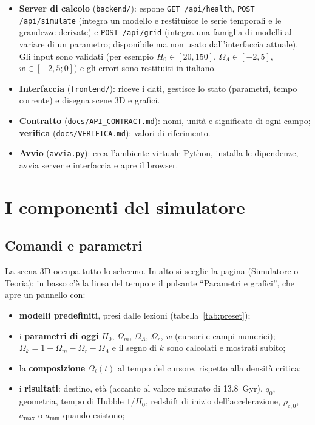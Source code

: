 \documentclass[11pt,a4paper]{article}
\newcommand{\Om}{\Omega_m}
\newcommand{\Or}{\Omega_r}
\newcommand{\OL}{\Omega_\Lambda}
\newcommand{\Ok}{\Omega_k}
\begin{document}
\begin{itemize}
  \item \textbf{Server di calcolo} (\texttt{backend/}): espone \texttt{GET /api/health}, \texttt{POST /api/simulate} (integra un modello e restituisce le serie temporali e le grandezze derivate) e \texttt{POST /api/grid} (integra una famiglia di modelli al variare di un parametro; disponibile ma non usato dall'interfaccia attuale). Gli input sono validati (per esempio $H_0\in[20,150]$, $\OL\in[-2,5]$, $w\in[-2{,}5;0]$) e gli errori sono restituiti in italiano.
  \item \textbf{Interfaccia} (\texttt{frontend/}): riceve i dati, gestisce lo stato (parametri, tempo corrente) e disegna scene 3D e grafici.
  \item \textbf{Contratto} (\texttt{docs/API\_CONTRACT.md}): nomi, unità e significato di ogni campo; \textbf{verifica} (\texttt{docs/VERIFICA.md}): valori di riferimento.
  \item \textbf{Avvio} (\texttt{avvia.py}): crea l'ambiente virtuale Python, installa le dipendenze, avvia server e interfaccia e apre il browser.
\end{itemize}

\section{I componenti del simulatore}

\subsection{Comandi e parametri}
La scena 3D occupa tutto lo schermo. In alto si sceglie la pagina (Simulatore o Teoria); in basso c'è la linea del tempo e il pulsante ``Parametri e grafici'', che apre un pannello con:
\begin{itemize}
  \item \textbf{modelli predefiniti}, presi dalle lezioni (tabella~\ref{tab:preset});
  \item i \textbf{parametri di oggi} $H_0$, $\Om$, $\OL$, $\Or$, $w$ (cursori e campi numerici); $\Ok=1-\Om-\Or-\OL$ e il segno di $k$ sono calcolati e mostrati subito;
  \item la \textbf{composizione} $\Omega_i(t)$ al tempo del cursore, rispetto alla densità critica;
  \item i \textbf{risultati}: destino, età (accanto al valore misurato di \SI{13.8}{Gyr}), $q_0$, geometria, tempo di Hubble $1/H_0$, redshift di inizio dell'accelerazione, $\rho_{c,0}$, $a_{\max}$ o $a_{\min}$ quando esistono;
\end{itemize}
\end{document}
